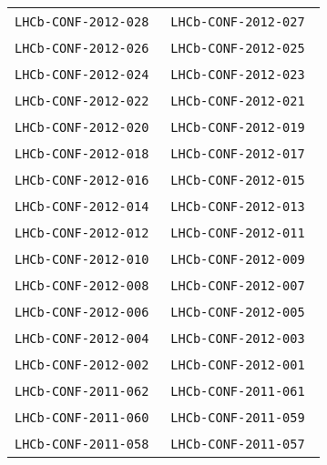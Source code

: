 \begin{center}
\begin{longtable}{ll}
\texttt{LHCb-CONF-2012-028}~\cite{LHCb-CONF-2012-028} & 
\texttt{LHCb-CONF-2012-027}~\cite{LHCb-CONF-2012-027} \\
\texttt{LHCb-CONF-2012-026}~\cite{LHCb-CONF-2012-026} & 
\texttt{LHCb-CONF-2012-025}~\cite{LHCb-CONF-2012-025} \\
\texttt{LHCb-CONF-2012-024}~\cite{LHCb-CONF-2012-024} & 
\texttt{LHCb-CONF-2012-023}~\cite{LHCb-CONF-2012-023} \\
\texttt{LHCb-CONF-2012-022}~\cite{LHCb-CONF-2012-022} & 
\texttt{LHCb-CONF-2012-021}~\cite{LHCb-CONF-2012-021} \\
\texttt{LHCb-CONF-2012-020}~\cite{LHCb-CONF-2012-020} & 
\texttt{LHCb-CONF-2012-019}~\cite{LHCb-CONF-2012-019} \\
\texttt{LHCb-CONF-2012-018}~\cite{LHCb-CONF-2012-018} & 
\texttt{LHCb-CONF-2012-017}~\cite{LHCb-CONF-2012-017} \\
\texttt{LHCb-CONF-2012-016}~\cite{LHCb-CONF-2012-016} & 
\texttt{LHCb-CONF-2012-015}~\cite{LHCb-CONF-2012-015} \\
\texttt{LHCb-CONF-2012-014}~\cite{LHCb-CONF-2012-014} & 
\texttt{LHCb-CONF-2012-013}~\cite{LHCb-CONF-2012-013} \\
\texttt{LHCb-CONF-2012-012}~\cite{LHCb-CONF-2012-012} & 
\texttt{LHCb-CONF-2012-011}~\cite{LHCb-CONF-2012-011} \\
\texttt{LHCb-CONF-2012-010}~\cite{LHCb-CONF-2012-010} & 
\texttt{LHCb-CONF-2012-009}~\cite{LHCb-CONF-2012-009} \\
\texttt{LHCb-CONF-2012-008}~\cite{LHCb-CONF-2012-008} & 
\texttt{LHCb-CONF-2012-007}~\cite{LHCb-CONF-2012-007} \\
\texttt{LHCb-CONF-2012-006}~\cite{LHCb-CONF-2012-006} & 
\texttt{LHCb-CONF-2012-005}~\cite{LHCb-CONF-2012-005} \\
\texttt{LHCb-CONF-2012-004}~\cite{LHCb-CONF-2012-004} & 
\texttt{LHCb-CONF-2012-003}~\cite{LHCb-CONF-2012-003} \\
\texttt{LHCb-CONF-2012-002}~\cite{LHCb-CONF-2012-002} & 
\texttt{LHCb-CONF-2012-001}~\cite{LHCb-CONF-2012-001} \\
\hline
\texttt{LHCb-CONF-2011-062}~\cite{LHCb-CONF-2011-062} &
\texttt{LHCb-CONF-2011-061}~\cite{LHCb-CONF-2011-061} \\ 
\texttt{LHCb-CONF-2011-060}~\cite{LHCb-CONF-2011-060} &
\texttt{LHCb-CONF-2011-059}~\cite{LHCb-CONF-2011-059} \\
\texttt{LHCb-CONF-2011-058}~\cite{LHCb-CONF-2011-058} & 
\texttt{LHCb-CONF-2011-057}~\cite{LHCb-CONF-2011-057} \\

\end{longtable}
\end{center}
